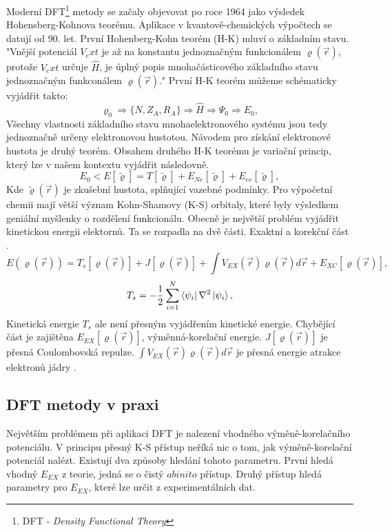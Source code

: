 \documentclass[
digital, %
table,   %
lof,     %
lot,     %
oneside,
]{fithesis3}
\begin{document}
Moderní DFT\footnote{DFT - \textit{Density Functional Theory}} metody se začaly objevovat po roce 1964 jako výsledek Hohensberg-Kohnova teorému. Aplikace v kvantově-chemických výpočtech se datují od 90. let. První Hohenberg-Kohn teorém (H-K) mluví o základním stavu. "Vnější potenciál  $V_ext$ je až na konstantu jednoznačným funkcionálem $\varrho(\vec{r})$, protože $V_ext$ určuje $\widehat{H}$, je úplný popis mnohačásticového základního stavu jednoznačným funkconálem $\varrho(\vec{r})$."\cite{PhysRev.136.B864} První H-K teorém můžeme schématicky vyjádřit takto:
\begin{equation}
\varrho_0 \Rightarrow \{N, Z_A, R_A\} \Rightarrow \widehat{H} \Rightarrow \Psi_0 \Rightarrow E_0,
\end{equation}
Všechny vlastnosti základního stavu mnohaelektronového systému jsou tedy jednoznačně určeny elektronovou hustotou. Návodem pro získání elektronové hustota je druhý teorém. Obsahem druhého H-K teorému je variační princip, který lze v našem kontextu vyjádřit následovně.
\begin{equation}
E_0 < E [\tilde{\varrho}] = T[\tilde{\varrho}] + E_{Ne}[\tilde{\varrho}] + E_{ee}[\tilde{\varrho}],
\end{equation}
Kde $\tilde{\varrho}(\vec{r})$ je zkušební hustota, splňující vazebné podmínky. Pro výpočetní chemii mají větší význam Kohn-Shamovy (K-S) orbitaly, které byly výsledkem geniální myšlenky o rozdělení funkcionálu. Obecně je největší problém vyjádřit kinetickou energii elektornů. Ta se rozpadla na dvě části. Exaktní a korekční část  \cite{jensen2007introduction}\cite{koch2000chemist}.
\begin{equation}
E(\varrho(\vec{r})) = T_s[\varrho(\vec{r})] + J[\varrho(\vec{r})] + \int V_{EX}(\vec{r})\varrho(\vec{r})d\vec{r} + E_{XC}[\varrho(\vec{r})],
\end{equation}
\begin{equation}
T_s = -\frac{1}{2} \sum_{i=1}^{N}  \bra{\psi_i}{\nabla^{2}}\ket{\psi_i},
\label{kineticka_energie_jednoelektronova}
\end{equation}
Kinetická energie $T_s$ ale není přesným vyjádřením kinetické energie. Chybějící část je zajištěna $E_{EX}[\varrho(\vec{r})]$, výměnná-korelační energie. $J[\varrho(\vec{r})]$ je přesná Coulombovská repulze. $\int V_{EX}(\vec{r})\varrho(\vec{r})d\vec{r}$ je přesná energie atrakce elektronů jádry \cite{parr1994density}.
\subsection{DFT metody v praxi}
Největším problémem při aplikaci DFT je nalezení vhodného výměně-korelačního potenciálu. V principu přesný K-S přístup neříká nic o tom, jak výměně-korelační potenciál nalézt. Existují dva způsoby hledání tohoto parametru. První hledá vhodný $E_{EX}$ z teorie, jedná se o čistý $ab inito$ přístup. Druhý přístup hledá parametry pro $E_{EX}$, které lze určit z experimentálních dat.
\end{document}
